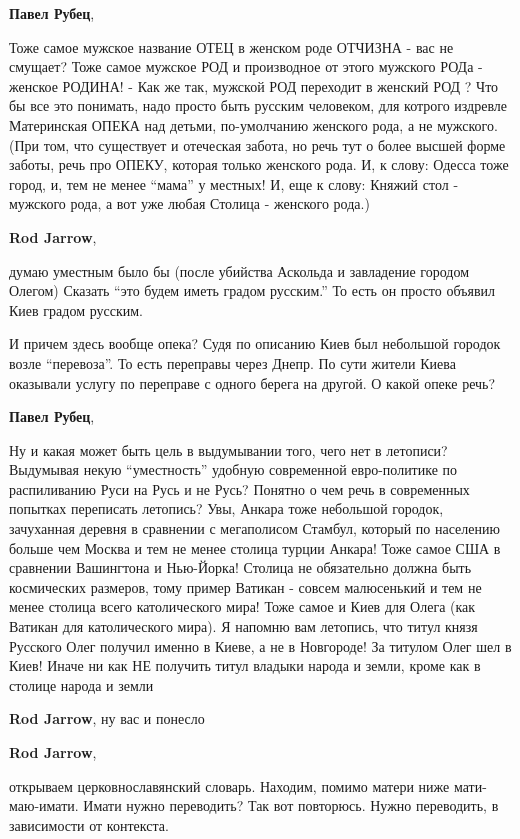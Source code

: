 \begin{itemize}
\begin{itemize}
\textbf{Павел Рубец}, 

Тоже самое мужское название ОТЕЦ в женском роде ОТЧИЗНА - вас не смущает? Тоже
самое мужское РОД и производное от этого мужского РОДа - женское РОДИНА! - Как
же так, мужской РОД переходит в женский РОД ? Что бы все это понимать, надо
просто быть русским человеком, для котрого издревле Материнская ОПЕКА над
детьми, по-умолчанию женского рода, а не мужского. (При том, что существует и
отеческая забота, но речь тут о более высшей форме заботы, речь про ОПЕКУ,
которая только женского рода. И, к слову: Одесса тоже город, и, тем не менее
\enquote{мама} у местных! И, еще к слову: Княжий стол - мужского рода, а вот уже любая
Столица - женского рода.)

\textbf{Rod Jarrow}, 

думаю уместным было бы (после убийства Аскольда и завладение городом Олегом)
Сказать \enquote{это будем иметь градом русским.} То есть он просто объявил
Киев градом русским.

И причем здесь вообще опека? Судя по описанию Киев был небольшой городок возле
\enquote{перевоза}. То есть переправы через Днепр. По сути жители Киева
оказывали услугу по переправе с одного берега на другой. О какой опеке речь?

\textbf{Павел Рубец}, 

Ну и какая может быть цель в выдумывании того, чего нет в летописи? Выдумывая
некую \enquote{уместность} удобную современной евро-политике по распиливанию Руси на
Русь и не Русь? Понятно о чем речь в современных попытках переписать летопись?
Увы, Анкара тоже небольшой городок, зачуханная деревня в сравнении с
мегаполисом Стамбул, который по населению больше чем Москва и тем не менее
столица турции Анкара! Тоже самое США в сравнении Вашингтона и Нью-Йорка!
Столица не обязательно должна быть космических размеров, тому пример Ватикан -
совсем малюсенький и тем не менее столица всего католического мира! Тоже самое
и Киев для Олега (как Ватикан для католического мира). Я напомню вам летопись,
что титул князя Русского Олег получил именно в Киеве, а не в Новгороде! За
титулом Олег шел в Киев! Иначе ни как НЕ получить титул владыки народа и земли,
кроме как в столице народа и земли

\textbf{Rod Jarrow}, ну вас и понесло

\textbf{Rod Jarrow}, 

открываем церковнославянский словарь. Находим, помимо матери ниже мати-маю-имати. Имати нужно переводить?
Так вот повторюсь. Нужно переводить, в зависимости от контекста.


\end{itemize}
\end{itemize}
